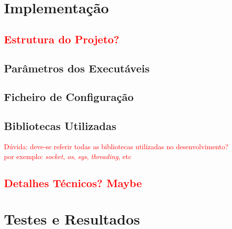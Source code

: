 \documentclass[a4paper,12pt]{scrreprt}
\begin{document}

\chapter{Implementação}

\section{\textcolor{red}{Estrutura do Projeto?}}

\section{Parâmetros dos Executáveis}

\section{Ficheiro de Configuração}

\section{Bibliotecas Utilizadas}

\textcolor{red}{
    Dúvida: deve-se referir todas as bibliotecas utilizadas no desenvolvimento? \\
    por exemplo: \textit{socket}, \textit{os}, \textit{sys}, \textit{threading}, etc
}

\section{\textcolor{red}{Detalhes Técnicos? Maybe}}



\chapter{Testes e Resultados}
\end{document}
